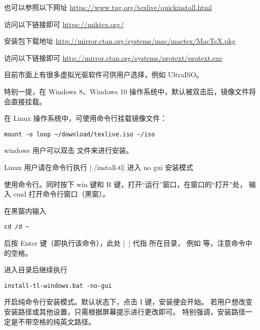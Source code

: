 也可以参照以下网址 \url{https://www.tug.org/texlive/quickinstall.html}


访问以下链接即可 \url{https://miktex.org/}


\MacTeX{} 安装包下载地址 \url{http://mirror.ctan.org/systems/mac/mactex/MacTeX.pkg}



访问以下链接即可 \url{http://mirror.ctan.org/systems/protext/protext.exe}



目前市面上有很多虚拟光驱软件可供用户选择，例如 UltraISO。

特别一提，在 Windows 8、Windows 10
操作系统中，默认被双击后，镜像文件将会直接挂载。

在 Linux 操作系统中，可使用命令行挂载镜像文件：
\begin{verbatim}
mount -o loop ~/download/texlive.iso ~/iso
\end{verbatim}



windows 用户可以双击  文件来进行安装。

Linux 用户请在命令行执行 |./install-tl| 进入 no gui 安装模式



使用命令行。同时按下 win 键和 R 键，打开“运行”窗口，在窗口的“打开”处，
输入 cmd 打开命令行窗口（黑窗）。

在黑窗内输入
\begin{verbatim}
cd /d ~
\end{verbatim}
后按 Enter 键（即执行该命令），此处 |~| 代指  
所在目录，
例如  等，注意命令中的空格。

进入目录后继续执行
\begin{verbatim}
install-tl-windows.bat -no-gui
\end{verbatim}
开启纯命令行安装模式。默认状态下，点击 I 键，安装便会开始。
若用户想改变安装路径或其他设置，只需根据屏幕提示进行更改即可。
特别强调，安装路径一定是不带空格的纯英文路径。



